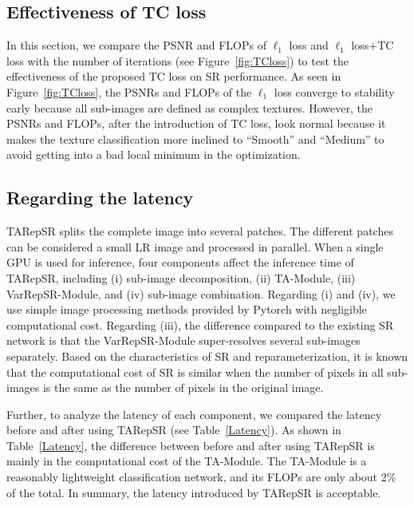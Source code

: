 \documentclass[sn-mathphys]{sn-jnl}%
\theoremstyle{thmstyleone}%
\theoremstyle{thmstyletwo}%
\theoremstyle{thmstylethree}%
\begin{document}
\subsection{Effectiveness of TC loss}
In this section, we compare the PSNR and FLOPs of $\ell_1$ loss and $\ell_1$ loss+TC loss with the number of iterations (see Figure~\ref{fig:TCloss}) to test the effectiveness of the proposed TC loss on SR performance. As seen in Figure~\ref{fig:TCloss}, the PSNRs and FLOPs of the $\ell_1$ loss converge to stability early because all sub-images are defined as complex textures. However, the PSNRs and FLOPs, after the introduction of TC loss, look normal because it makes the texture classification more inclined to ``Smooth'' and ``Medium'' to avoid getting into a bad local minimum in the optimization.

\subsection{Regarding the latency} 
TARepSR splits the complete image into several patches. The different patches can be considered a small LR image and processed in parallel. When a single GPU is used for inference, four components affect the inference time of TARepSR, including (i) sub-image decomposition, (ii) TA-Module, (iii) VarRepSR-Module, and (iv) sub-image combination. Regarding (i) and (iv), we use simple image processing methods provided by Pytorch with negligible computational cost. Regarding (iii), the difference compared to the existing SR network is that the VarRepSR-Module super-resolves several sub-images separately. Based on the characteristics of SR and reparameterization, it is known that the computational cost of SR is similar when the number of pixels in all sub-images is the same as the number of pixels in the original image.

Further, to analyze the latency of each component, we compared the latency before and after using TARepSR (see Table~\ref{Latency}). As shown in Table~\ref{Latency}, the difference between before and after using TARepSR is mainly in the computational cost of the TA-Module. The TA-Module is a reasonably lightweight classification network, and its FLOPs are only about 2\% of the total. In summary, the latency introduced by TARepSR is acceptable.
\end{document}
